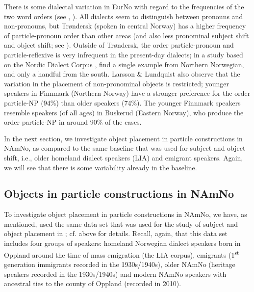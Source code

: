 \documentclass[output=paper]{langscibook}
\begin{document}
There is some dialectal variation in EurNo with regard to the frequencies of the two word orders (see \citealt{LarssonLundquist2014}, \citealt{LundquistTengesdal2022}). All dialects seem to distinguish between pronouns and non-pronouns, but Trøndersk (spoken in central Norway) has a higher frequency of particle-pronoun order than other areas (and also less pronominal subject shift and object shift; see \citealt{OestboeMunch2013}). Outside of Trøndersk, the order particle-pronoun and particle-reflexive is very infrequent in the present-day dialects; in a study based on the Nordic Dialect Corpus \citep{JohannessenEtAl2009}, \citet{LarssonLundquist2014} find a single example from Northern Norwegian, and only a handful from the south. Larsson \& Lundquist also observe that the variation in the placement of non-pronominal objects is restricted; younger speakers in Finnmark (Northern Norway) have a stronger preference for the order particle-NP (94\%) than older speakers (74\%). The younger Finnmark speakers resemble speakers (of all ages) in Buskerud (Eastern Norway), who produce the order particle-NP in around 90\% of the cases.

In the next section, we investigate object placement in particle constructions in NAmNo, as compared to the same baseline that was used for subject and object shift, i.e., older homeland dialect speakers (LIA) and emigrant speakers. Again, we will see that there is some variability already in the baseline. 

\subsection{Objects in particle constructions in NAmNo}\label{sec:larsson:5.2}

To investigate object placement in particle constructions in NAmNo, we have, as mentioned, used the same data set that was used for the study of subject and object placement in \citet{LarssonForthcoming}; cf.  above for details. Recall, again, that this data set includes four groups of speakers: homeland Norwegian dialect speakers born in Oppland around the time of mass emigration (the LIA corpus), emigrants (1\textsuperscript{st} generation immigrants recorded in the 1930s/1940s), older NAmNo (heritage speakers recorded in the 1930s/1940s) and modern NAmNo speakers with ancestral ties to the county of Oppland (recorded in 2010). 
\end{document}
